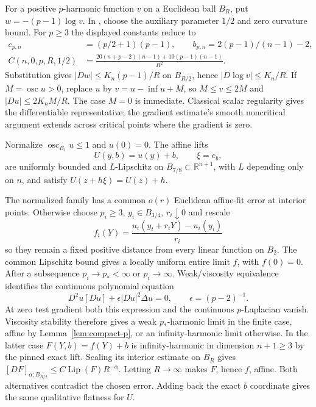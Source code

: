 \documentclass[11pt]{article}
\theoremstyle{remark}\newtheorem{remark}[theorem]{Remark}
\newcommand{\osc}{\operatorname{osc}}
\newcommand{\R}{\mathbb R}
\begin{document}
For a positive $p$-harmonic function $v$ on a Euclidean ball $B_R$,
put $w=-(p-1)\log v$. In \cite[Theorem 1.1]{KotschwarNi}, choose
the auxiliary parameter $1/2$ and zero curvature bound. For $p\geq3$
the displayed constants reduce to
\[
 \begin{split}
 c_{p,n}&=(p/2+1)(p-1),\qquad
 b_{p,n}=2(p-1)/(n-1)-2,\\
 C(n,0,p,R,1/2)&=
 \frac{20(n+p-2)(n-1)+10(p-1)(n-1)}{R^2}.
 \end{split}
\]
Substitution gives $|Dw|\leq K_n(p-1)/R$ on $B_{R/2}$, hence
$|D\log v|\leq K_n/R$. If $M=\osc u>0$, replace $u$ by
$v=u-\inf u+M$, so $M\leq v\leq2M$ and
$|Du|\leq2K_nM/R$. The case $M=0$ is immediate. Classical scalar
regularity gives the differentiable representative; the gradient
estimate's smooth noncritical argument extends across critical points
where the gradient is zero.

Normalize $\osc_{B_1}u\leq1$ and $u(0)=0$. The affine lifts
\[
 U(y,b)=u(y)+b,\qquad \xi=e_b,
\]
are uniformly bounded and $L$-Lipschitz on $B_{7/8}\subset\R^{n+1}$,
with $L$ depending only on $n$, and satisfy
$U(z+h\xi)=U(z)+h$.



The normalized family has a common $o(r)$ Euclidean affine-fit error
at interior points. Otherwise choose $p_i\geq3$, $y_i\in B_{3/4}$,
$r_i\downarrow0$ and rescale
\[
 f_i(Y)=\frac{u_i(y_i+r_iY)-u_i(y_i)}{r_i}
\]
so they remain a fixed positive distance from every linear function
on $B_2$. The common Lipschitz bound gives a locally uniform entire
limit $f$, with $f(0)=0$. After a subsequence $p_i\to p_*<\infty$
or $p_i\to\infty$. Weak/viscosity equivalence identifies the
continuous polynomial equation
\begin{equation}\label{eq:p-poly}
 D^2u[Du]+\epsilon |Du|^2\Delta u=0,
 \qquad\epsilon=(p-2)^{-1}.
\end{equation}
At zero test gradient both this expression and the continuous
$p$-Laplacian vanish. Viscosity stability therefore gives a weak
$p_*$-harmonic limit in the finite case, affine by
Lemma~\ref{lem:compact-p}, or an infinity-harmonic limit otherwise.
In the latter case $F(Y,b)=f(Y)+b$ is infinity-harmonic in dimension
$n+1\geq3$ by the pinned exact lift. Scaling its interior estimate
on $B_R$ gives $[DF]_{\alpha;B_{R/2}}\leq C\operatorname{Lip}(F)R^{-\alpha}$.
Letting $R\to\infty$ makes $F$, hence $f$, affine. Both alternatives
contradict the chosen error. Adding back the exact $b$ coordinate
gives the same qualitative flatness for $U$.
\end{document}
